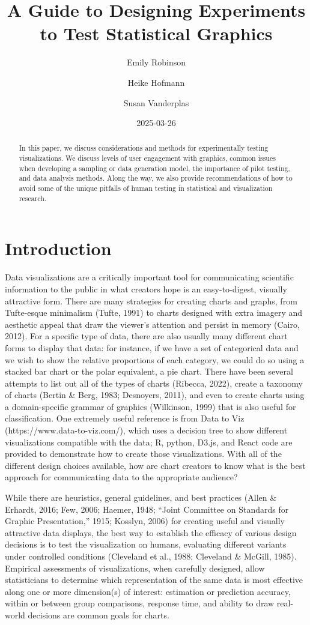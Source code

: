 \documentclass[
  10pt,
  letterpaper,
  DIV=11,
  numbers=noendperiod]{scrartcl}
\title{A Guide to Designing Experiments to Test Statistical Graphics}
\author{Emily Robinson \and Heike Hofmann \and Susan Vanderplas}
\date{2025-03-26}
\begin{document}
\maketitle
\begin{abstract}
In this paper, we discuss considerations and methods for experimentally
testing visualizations. We discuss levels of user engagement with
graphics, common issues when developing a sampling or data generation
model, the importance of pilot testing, and data analysis methods. Along
the way, we also provide recommendations of how to avoid some of the
unique pitfalls of human testing in statistical and visualization
research.
\end{abstract}


\section{Introduction}\label{introduction}

Data visualizations are a critically important tool for communicating
scientific information to the public in what creators hope is an
easy-to-digest, visually attractive form. There are many strategies for
creating charts and graphs, from Tufte-esque minimalism (Tufte, 1991) to
charts designed with extra imagery and aesthetic appeal that draw the
viewer's attention and persist in memory (Cairo, 2012). For a specific
type of data, there are also usually many different chart forms to
display that data: for instance, if we have a set of categorical data
and we wish to show the relative proportions of each category, we could
do so using a stacked bar chart or the polar equivalent, a pie chart.
There have been several attempts to list out all of the types of charts
(Ribecca, 2022), create a taxonomy of charts (Bertin \& Berg, 1983;
Desnoyers, 2011), and even to create charts using a domain-specific
grammar of graphics (Wilkinson, 1999) that is also useful for
classification. One extremely useful reference is from Data to Viz
(https://www.data-to-viz.com/), which uses a decision tree to show
different visualizations compatible with the data; R, python, D3.js, and
React code are provided to demonstrate how to create those
visualizations. With all of the different design choices available, how
are chart creators to know what is the best approach for communicating
data to the appropriate audience?

While there are heuristics, general guidelines, and best practices
(Allen \& Erhardt, 2016; Few, 2006; Haemer, 1948; {``Joint Committee on
Standards for Graphic Presentation,''} 1915; Kosslyn, 2006) for creating
useful and visually attractive data displays, the best way to establish
the efficacy of various design decisions is to test the visualization on
humans, evaluating different variants under controlled conditions
(Cleveland et al., 1988; Cleveland \& McGill, 1985). Empirical
assessments of visualizations, when carefully designed, allow
statisticians to determine which representation of the same data is most
effective along one or more dimension(s) of interest: estimation or
prediction accuracy, within or between group comparisons, response time,
and ability to draw real-world decisions are common goals for charts.
\end{document}
